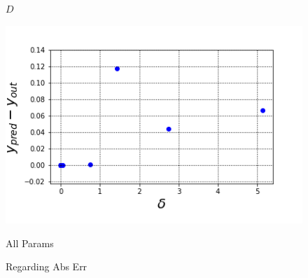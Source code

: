 \documentclass[16.7pt]{jsarticle}
\begin{document}
\begin{figure}[h]
\begin{minipage}{0.45\hsize}
				\caption{$ D $}
			\end{minipage}
			\begin{minipage}{0.45\hsize}
				\centering
				\includegraphics[width= 0.85\columnwidth]{./figure/ERR_DELTA.png}
				\caption{All Params}
			\end{minipage}
		\caption{Regarding Abs Err}
		\end{figure}
		
\end{document}
